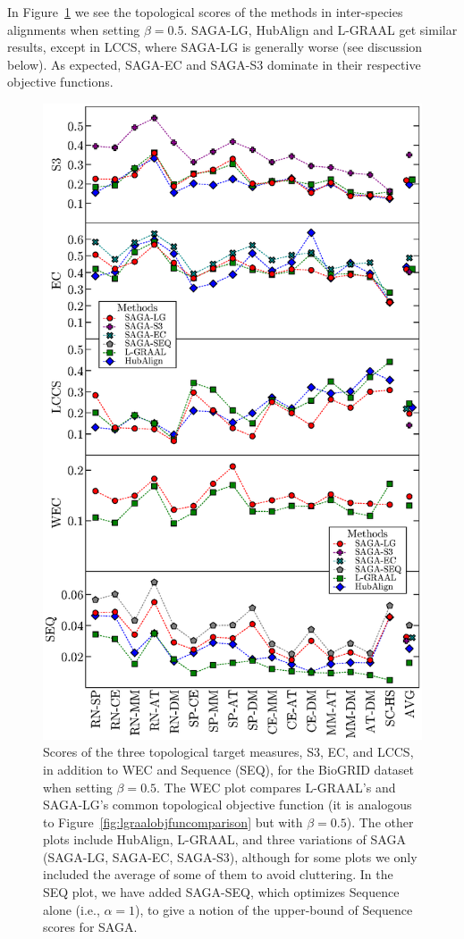 \documentclass{bioinfo}
\begin{document}
In Figure~\ref{fig:biogrid_beta0,5} we see the topological scores of the methods in inter-species alignments when setting $\beta=0.5$. SAGA-LG, HubAlign and L-GRAAL get similar results, except in LCCS, where SAGA-LG is generally worse (see discussion below). As expected, SAGA-EC and SAGA-S3 dominate in their respective objective functions.

\begin{figure}
\centering
\includegraphics[width=0.99\linewidth]{biogrid_beta05_bw.eps}
\caption{Scores of the three topological target measures, S3, EC, and LCCS, in addition to WEC and Sequence (SEQ), for the BioGRID dataset when setting $\beta=0.5$. The WEC plot compares L-GRAAL's and SAGA-LG's common topological objective function (it is analogous to Figure~\ref{fig:lgraalobjfuncomparison} but with $\beta=0.5$). The other plots include HubAlign, L-GRAAL, and three variations of SAGA (SAGA-LG, SAGA-EC, SAGA-S3), although for some plots we only included the average of some of them to avoid cluttering. In the SEQ plot, we have added SAGA-SEQ, which optimizes Sequence alone (i.e., $\alpha=1$), to give a notion of the upper-bound of Sequence scores for SAGA.}
\label{fig:biogrid_beta0,5}
\end{figure}
\end{document}
